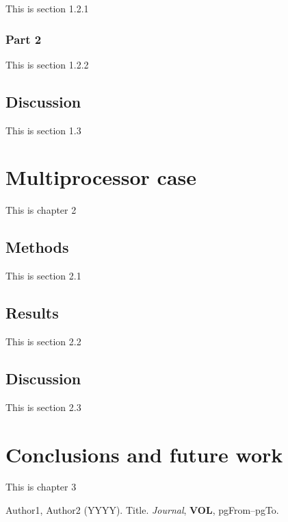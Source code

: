 \documentclass[12pt]{report}
\begin{document}
This is section 1.2.1

\subsection{Part 2}

This is section 1.2.2

\section{Discussion}
This is section 1.3


\chapter{Multiprocessor case}

This is chapter 2

\section{Methods}

This is section 2.1

\section{Results}

This is section 2.2

\section{Discussion}

This is section 2.3

\chapter{Conclusions and future work}

This is chapter 3


\newpage
{}


\begin{thebibliography}{99}

Author1, Author2 (YYYY). Title. \textit{Journal}, \textbf{VOL}, pgFrom--pgTo.

\end{thebibliography}
\end{document}
